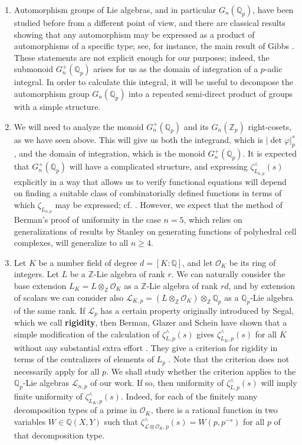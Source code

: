 \documentclass[12pt]{article}
\begin{document}
\begin{enumerate}
    \item 
Automorphism groups of Lie algebras, and in particular $G_{n}(\mathbb{Q}_{p})$, have been studied before from a different point of view, and there are classical results showing that any automorphism may be expressed as a product of automorphisms of a specific type; see, for instance, the main result of Gibbs \cite{Gibbs}.  These statements are not explicit enough for our purposes; indeed, the submonoid $G_{n}^{+}(\mathbb{Q}_p)$ arises for us as the domain of integration of a $p$-adic integral.  In order to calculate this integral, it will be useful to decompose the automorphism group $G_{n}(\mathbb{Q}_p)$ into a repeated semi-direct product of groups with a simple structure.
\item 
We will need to analyze the monoid $G_{n}^{+}(\mathbb{Q}_p)$ and its $G_{n}(\mathbb{Z}_p)$ right-cosets, as we have seen above. This will give us both the integrand, which is $|\det\varphi|_{p}^{s}$, and the domain of integration, which is the monoid $G_{n}^{+}(\mathbb{Q}_p)$. It is expected that $G_{n}^{+}(\mathbb{Q}_{p})$ will have a complicated structure, and expressing $\zeta_{L_{n,p}}^{\wedge}(s)$ explicitly in a way that allows us to verify functional equations will depend on finding a suitable class of combinatorially defined functions in terms of which $\zeta_{L_{n,p}}$ may be expressed; cf. \cite[Thm. 4.21]{CornevaleScheinVoll}. However, we expect that the method of Berman's proof of uniformity in the case $n=5$, which relies on generalizations of results by Stanley on generating functions of polyhedral cell complexes, will generalize to all $n\geq{4}$.
\item 
Let $K$ be a number field of degree $d=[K:\mathbb{Q}]$, and let $\mathcal{O}_K$ be its ring of integers. Let $L$ be a $\mathbb{Z}$-Lie algebra of rank $r$. We can naturally consider the base extension $L_{K}=L\otimes_{\mathbb{Z}}\mathcal{O}_{K}$ as a $\mathbb{Z}$-Lie algebra of rank $rd$, and by extension of scalars we can consider also $\mathcal{L}_{K,p}=(L\otimes_{\mathbb{Z}}\mathcal{O}_K)\otimes_{\mathbb{Z}}\mathbb{Q}_p$ as a $\mathbb{Q}_p$-Lie algebra of the same rank. If $\mathcal{L}_{p}$ has a certain property originally introduced by Segal, which we call \textbf{rigidity}, then Berman, Glazer and Schein have shown that a simple modification of the calculation of $\zeta_{L,p}^{\wedge}(s)$ gives $\zeta_{L_{K},p}^{\wedge}(s)$ for all $K$ without any substantial extra effort \cite[Prop. 3.14]{BermanGlazerSchein}. They give a criterion for rigidity in terms of the centralizers of elements of $L_{p}$ \cite[Thm. 3.9]{BermanGlazerSchein}. Note that the criterion does not necessarily apply for all $p$. We shall study whether the criterion applies to the $\mathbb{Q}_p$-Lie algebras $\mathcal{L}_{n,p}$ of our work. If so, then uniformity of $\zeta_{L,p}^{\wedge}(s)$ will imply finite uniformity of $\zeta_{L_{K},p}^{\wedge}(s)$. Indeed, for each of the finitely many decomposition types of a prime in $\mathcal{O}_K$, there is a rational function in two variables $W\in\mathbb{Q}(X,Y)$ such that $\zeta_{\mathcal{L}\otimes\mathcal{O}_K,p}^{\wedge}(s)=W(p,p^{-s})$ for all $p$ of that decomposition type.
\end{enumerate}
\end{document}
